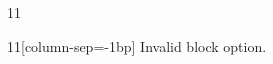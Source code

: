 \documentclass[paper=A4]{ropas-poster}
\begin{document}
\begin{postergrid}{1}{1}
\begin{posterblock}{1}{1}[column-sep=-1bp]
Invalid block option.
\end{posterblock}
\end{postergrid}
\end{document}
